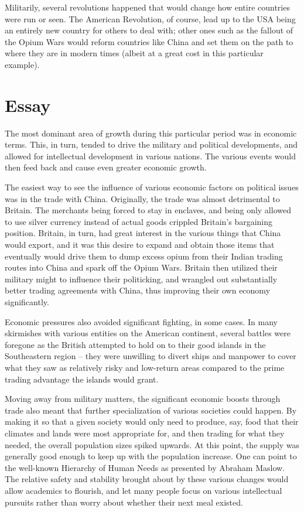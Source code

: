 \documentclass{article}
\begin{document}
Militarily, several revolutions happened that would change how entire countries were run or seen.
The American Revolution, of course, lead up to the USA being an entirely new country for others to deal with; other ones such as the fallout of the Opium Wars would reform countries like China and set them on the path to where they are in modern times (albeit at a great cost in this particular example).

\section{Essay}

The most dominant area of growth during this particular period was in economic terms.
This, in turn, tended to drive the military and political developments, and allowed for intellectual development in various nations.
The various events would then feed back and cause even greater economic growth.

The easiest way to see the influence of various economic factors on political issues was in the trade with China.
Originally, the trade was almost detrimental to Britain.
The merchants being forced to stay in enclaves, and being only allowed to use silver currency instead of actual goods crippled Britain's bargaining position.
Britain, in turn, had great interest in the various things that China would export, and it was this desire to expand and obtain those items that eventually would drive them to dump excess opium from their Indian trading routes into China and spark off the Opium Wars.
Britain then utilized their military might to influence their politicking, and wrangled out substantially better trading agreements with China, thus improving their own economy significantly.

Economic pressures also avoided significant fighting, in some cases.
In many skirmishes with various entities on the American continent, several battles were foregone as the British attempted to hold on to their good islands in the Southeastern region -- they were unwilling to divert ships and manpower to cover what they saw as relatively risky and low-return areas compared to the prime trading advantage the islands would grant.

Moving away from military matters, the significant economic boosts through trade also meant that further specialization of various societies could happen.
By making it so that a given society would only need to produce, say, food that their climates and lands were most appropriate for, and then trading for what they needed, the overall population sizes spiked upwards.
At this point, the supply was generally good enough to keep up with the population increase.
One can point to the well-known Hierarchy of Human Needs as presented by Abraham Maslow.
The relative safety and stability brought about by these various changes would allow academics to flourish, and let many people focus on various intellectual pursuits rather than worry about whether their next meal existed.
\end{document}
